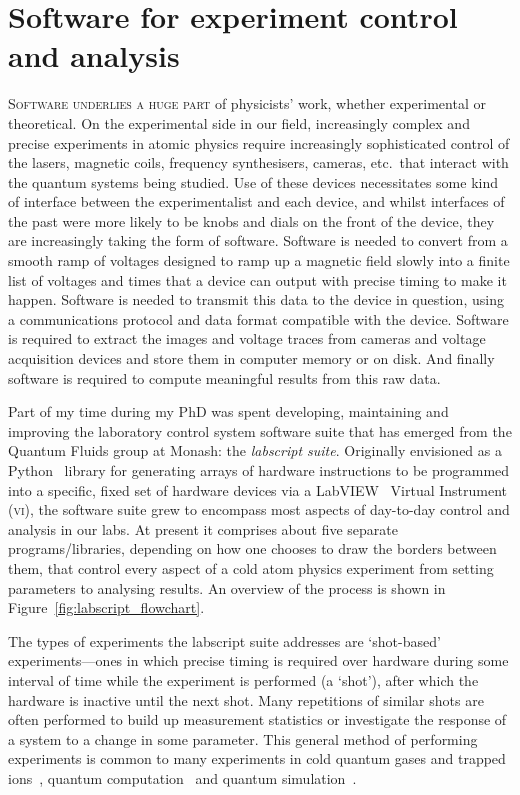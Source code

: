\chapter{Software for experiment control and analysis}\label{chap:software}

\lettrine[lines=3]{S}{oftware underlies a huge part} of physicists' work, whether experimental or theoretical. On the experimental side in our field, increasingly complex and precise experiments in atomic physics require increasingly sophisticated control of the lasers, magnetic coils, frequency synthesisers, cameras, etc.~that interact with the quantum systems being studied. Use of these devices necessitates some kind of interface between the experimentalist and each device, and whilst interfaces of the past were more likely to be knobs and dials on the front of the device, they are increasingly taking the form of software. Software is needed to convert from a smooth ramp of voltages designed to ramp up a magnetic field slowly into a finite list of voltages and times that a device can output with precise timing to make it happen. Software is needed to transmit this data to the device in question, using a communications protocol and data format compatible with the device. Software is required to extract the images and voltage traces from cameras and voltage acquisition devices and store them in computer memory or on disk. And finally software is required to compute meaningful results from this raw data.

Part of my time during my PhD was spent developing, maintaining and improving the laboratory control system software suite that has emerged from the Quantum Fluids group at Monash: the \emph{labscript suite}. Originally envisioned as a Python~\cite{python_software_foundation_python_2018} library for generating arrays of hardware instructions to be programmed into a specific, fixed set of hardware devices via a LabVIEW~\cite{national_instruments_laboratory_2018} Virtual Instrument (\textsc{vi}), the software suite grew to encompass most aspects of day-to-day control and analysis in our labs. At present it comprises about five separate programs/libraries, depending on how one chooses to draw the borders between them, that control every aspect of a cold atom physics experiment from setting parameters to analysing results. An overview of the process is shown in Figure~\ref{fig:labscript_flowchart}.

The types of experiments the labscript suite addresses are `shot-based' experiments---ones in which precise timing is required over hardware during some interval of time while the experiment is performed (a `shot'), after which the hardware is inactive until the next shot. Many repetitions of similar shots are often performed to build up measurement statistics or investigate the response of a system to a change in some parameter. This general method of performing experiments is common to many experiments in cold quantum gases and trapped ions~\cite{robins_atom_2013-1, cronin_optics_2009-1}, quantum computation~\cite{negretti_quantum_2011-1, ladd_quantum_2010-1} and quantum simulation~\cite{bloch_quantum_2012-1, blatt_quantum_2012-1}.


